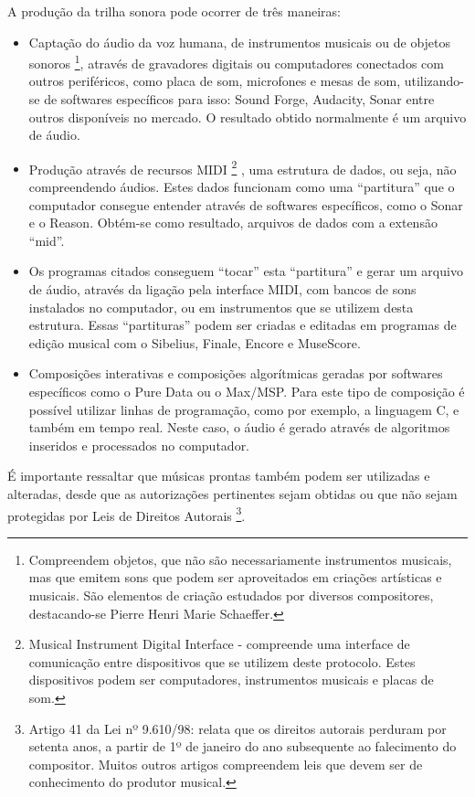 A produção da trilha sonora pode ocorrer de três maneiras:
\begin{itemize}
\item Captação do áudio da voz humana, de instrumentos musicais ou de
 objetos sonoros
\footnote{Compreendem objetos, que não são necessariamente instrumentos
 musicais, mas que emitem sons que podem ser aproveitados em criações
 artísticas e musicais. São elementos de criação estudados por diversos 
compositores, destacando-se Pierre Henri Marie Schaeffer.}, 
através de gravadores digitais ou computadores conectados com outros
 periféricos, como placa de som, microfones e mesas de som, utilizando-se
 de softwares específicos para isso: Sound Forge, Audacity, Sonar entre 
outros disponíveis no mercado. O resultado obtido normalmente é um 
arquivo de áudio.
\item Produção através de recursos MIDI
\footnote{Musical Instrument Digital Interface - compreende uma interface
 de comunicação entre dispositivos que se utilizem deste protocolo. 
Estes dispositivos podem ser computadores, instrumentos musicais e 
placas de som.}
, uma estrutura de dados, ou seja, não compreendendo áudios. Estes 
dados funcionam como uma ``partitura'' que o computador consegue
 entender através de softwares específicos, como o Sonar e o Reason. 
Obtém-se como resultado, arquivos de dados com a extensão ``mid''.
\item Os programas citados conseguem ``tocar'' esta ``partitura'' e 
gerar um arquivo de áudio, através da ligação pela interface MIDI, com 
bancos de sons instalados no computador, ou em instrumentos que se 
utilizem desta estrutura. Essas ``partituras'' podem ser criadas e 
editadas em programas de edição musical com o Sibelius, Finale, Encore
 e MuseScore.
\item Composições interativas e composições algorítmicas geradas por
 softwares específicos como o Pure Data ou o Max/MSP. Para este tipo 
de composição é possível utilizar linhas de programação, como por 
exemplo, a linguagem C, e também em tempo real. Neste caso, o áudio 
é gerado através de algoritmos inseridos e processados no computador.
\end{itemize}

É importante ressaltar que músicas prontas também podem ser utilizadas
 e alteradas, desde que as autorizações pertinentes sejam obtidas ou 
que não sejam protegidas por Leis de Direitos Autorais
\footnote{Artigo 41 da Lei nº 9.610/98: relata que os direitos autorais 
perduram por setenta anos, a partir de 1º de janeiro do ano subsequente
 ao falecimento do compositor. Muitos outros artigos compreendem leis 
que devem ser de conhecimento do produtor musical.}. 

